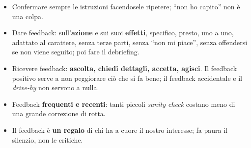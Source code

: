 \begin{itemize}
        \textbf{traiettorie}, non un punto dell'anno. Le valutazioni puntuali
        generano \emph{lying, hiding, faking}.
  \item Confermare sempre le istruzioni facendosele ripetere; ``non ho
        capito'' non è una colpa.
  \item Dare feedback: sull'\textbf{azione} e sui suoi \textbf{effetti}, specifico,
        presto, uno a uno, adattato al carattere, senza terze parti, senza
        ``non mi piace'', senza offendersi se non viene seguito; poi fare il
        debriefing.
  \item Ricevere feedback: \textbf{ascolta, chiedi dettagli, accetta, agisci}.
        Il feedback positivo serve a non peggiorare ciò che si fa bene; il
        feedback accidentale e il \emph{drive-by} non servono a nulla.
  \item Feedback \textbf{frequenti e recenti}: tanti piccoli \emph{sanity
        check} costano meno di una grande correzione di rotta.
  \item Il feedback è \textbf{un regalo} di chi ha a cuore il nostro
        interesse; fa paura il silenzio, non le critiche.
\end{itemize}
